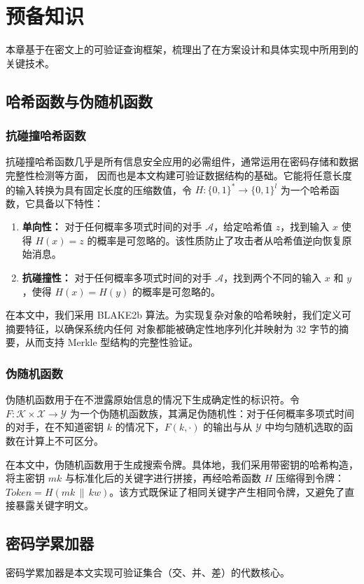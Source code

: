\chapter{预备知识}
本章基于在密文上的可验证查询框架，梳理出了在方案设计和具体实现中所用到的关键技术。
\section{哈希函数与伪随机函数}
\subsection{抗碰撞哈希函数}
抗碰撞哈希函数几乎是所有信息安全应用的必需组件，通常运用在密码存储和数据完整性检测等方面，
因而也是本文构建可验证数据结构的基础。它能将任意长度的输入转换为具有固定长度的压缩数值，令
$H:\{0,1\}^* \rightarrow \{0,1\}^l$ 为一个哈希函数，它具备以下特性：
\begin{enumerate}
    \item \textbf{单向性：} 对于任何概率多项式时间的对手 $\mathcal{A}$，给定哈希值 $z$，找到输入 $x$ 使得 $H(x)=z$ 的概率是可忽略的。该性质防止了攻击者从哈希值逆向恢复原始消息。
    \item \textbf{抗碰撞性：} 对于任何概率多项式时间的对手 $\mathcal{A}$，找到两个不同的输入 $x$ 和 $y$，使得 $H(x)=H(y)$ 的概率是可忽略的。
\end{enumerate}

在本文中，我们采用 BLAKE2b 算法。为实现复杂对象的哈希映射，我们定义可摘要特征，以确保系统内任何
对象都能被确定性地序列化并映射为 32 字节的摘要，从而支持 Merkle 型结构的完整性验证。

\subsection{伪随机函数}
伪随机函数用于在不泄露原始信息的情况下生成确定性的标识符。令 $F: \mathcal{K} \times \mathcal{X} \to \mathcal{Y}$ 为一个伪随机函数族，其满足伪随机性：对于任何概率多项式时间的对手，在不知道密钥 $k$ 的情况下，$F(k,\cdot)$ 的输出与从 $\mathcal{Y}$ 中均匀随机选取的函数在计算上不可区分。

在本文中，伪随机函数用于生成搜索令牌。具体地，我们采用带密钥的哈希构造，将主密钥 $mk$ 与标准化后的关键字进行拼接，再经哈希函数 $H$ 压缩得到令牌：
$Token = H(mk \,\|\, kw)$。该方式既保证了相同关键字产生相同令牌，又避免了直接暴露关键字明文。
\section{密码学累加器}
密码学累加器是本文实现可验证集合（交、并、差）的代数核心。
